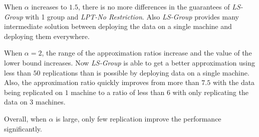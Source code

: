 \documentclass[12pt]{article}
\theoremstyle{mystyle}
\begin{document}
     When $\alpha$ increases to $1.5$, there is no more differences in the  guarantees of {\it LS-Group} with 1 group and {\it LPT-No
       Restriction}. Also {\it LS-Group} provides many intermediate  solution between deploying the data on a single machine and deploying
     them everywhere.
     
     When $\alpha=2$, the range of the approximation ratios increase and
     the value of the lower bound increases. Now {\it LS-Group} is able to
     get a better approximation using less than $50$ replications than is
     possible by deploying data on a single machine. Also, the
     approximation ratio quickly improves from more than $7.5$ with the
     data being replicated on $1$ machine to a ratio of less than $6$ with
     only replicating the data on $3$ machines.
     
     Overall, when $\alpha$ is large, only few replication improve the
     performance significantly.
     
\end{document}
